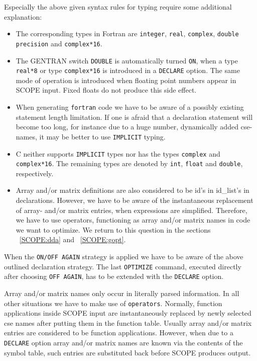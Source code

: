 Especially the above given syntax rules for typing require some additional 
explanation:
\begin{itemize}
\item The corresponding types in Fortran are {\tt integer}, {\tt real},
{\tt complex}, {\tt double precision} and {\tt complex*16}.
\item The GENTRAN switch {\tt DOUBLE} is automatically turned {\tt ON},
when a type {\tt real*8} or  type {\tt complex*16}  is introduced in
a {\tt DECLARE} option. The same mode of operation is introduced when 
floating point numbers appear in SCOPE input. Fixed floats do not produce 
this side effect.
\item When generating {\tt fortran} code we have to be aware of a possibly 
existing statement length limitation. If one is afraid that a declaration statement 
will become 
too long, for instance due to a huge number, dynamically added cse-names, 
it may be better to use {\tt IMPLICIT} typing.
\item C neither supports {\tt IMPLICIT} types nor has the 
types {\tt complex} and {\tt complex*16}. The remaining types are denoted
by {\tt int}, {\tt float} and {\tt double}, respectively.
\item Array and/or matrix definitions are also considered to be id's in
 id\_list's in declarations. 
However, we have to be aware of the instantaneous replacement of array-
and/or matrix entries, when  expressions are simplified. Therefore, we have to
use operators, functioning as array and/or matrix names in code we want to
optimize. We return to this question in the sections ~\ref{SCOPE:dda} and
 ~\ref{SCOPE:gopt}.
\end{itemize}
When the {\tt ON/OFF AGAIN} strategy is applied we have to be aware of the
above outlined declaration strategy. The last {\tt OPTIMIZE} command,
executed directly after choosing {\tt OFF AGAIN}, has to be extended 
with the {\tt DECLARE} option. 

Array and/or matrix names only occur in literally parsed information. In all
other situations we have to make use of {\REDUCE} {\tt operators}. Normally,
function applications inside SCOPE input are instantaneously replaced by
newly selected cse names after putting them in the function table.
Usually array and/or matrix entries are considered to be function applications.
However, when due to a {\tt DECLARE} option array and/or matrix names
are known via the contents of the symbol table, such entries are 
substituted back before SCOPE produces output.

